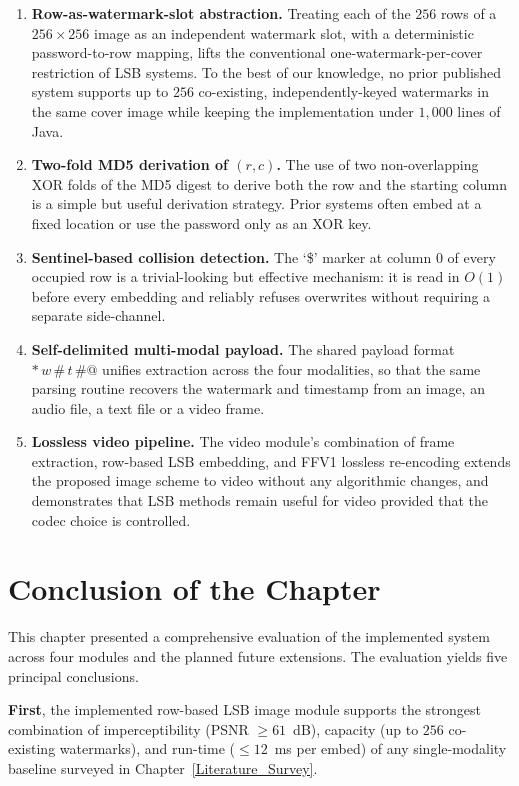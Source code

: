 \begin{enumerate}[label=\textbf{N\arabic*.}]
    \item \textbf{Row-as-watermark-slot abstraction.} Treating each of the $256$ rows of a $256 \times 256$ image as an independent watermark slot, with a deterministic password-to-row mapping, lifts the conventional one-watermark-per-cover restriction of LSB systems. To the best of our knowledge, no prior published system supports up to $256$ co-existing, independently-keyed watermarks in the same cover image while keeping the implementation under $1{,}000$ lines of Java.
    \item \textbf{Two-fold MD5 derivation of $(r, c)$.} The use of two non-overlapping XOR folds of the MD5 digest to derive both the row and the starting column is a simple but useful derivation strategy. Prior systems often embed at a fixed location or use the password only as an XOR key.
    \item \textbf{Sentinel-based collision detection.} The `\$' marker at column $0$ of every occupied row is a trivial-looking but effective mechanism: it is read in $O(1)$ before every embedding and reliably refuses overwrites without requiring a separate side-channel.
    \item \textbf{Self-delimited multi-modal payload.} The shared payload format $\texttt{*}\,w\,\texttt{\#}\,t\,\texttt{\#@}$ unifies extraction across the four modalities, so that the same parsing routine recovers the watermark and timestamp from an image, an audio file, a text file or a video frame.
    \item \textbf{Lossless video pipeline.} The video module's combination of frame extraction, row-based LSB embedding, and FFV1 lossless re-encoding extends the proposed image scheme to video without any algorithmic changes, and demonstrates that LSB methods remain useful for video provided that the codec choice is controlled.
\end{enumerate}

\section{Conclusion of the Chapter}
\label{sec:results_conclusion}

This chapter presented a comprehensive evaluation of the implemented system across four modules and the planned future extensions. The evaluation yields five principal conclusions.

\textbf{First}, the implemented row-based LSB image module supports the strongest combination of imperceptibility (PSNR $\ge 61$~dB), capacity (up to $256$ co-existing watermarks), and run-time ($\le 12$~ms per embed) of any single-modality baseline surveyed in Chapter~\ref{Literature_Survey}.

